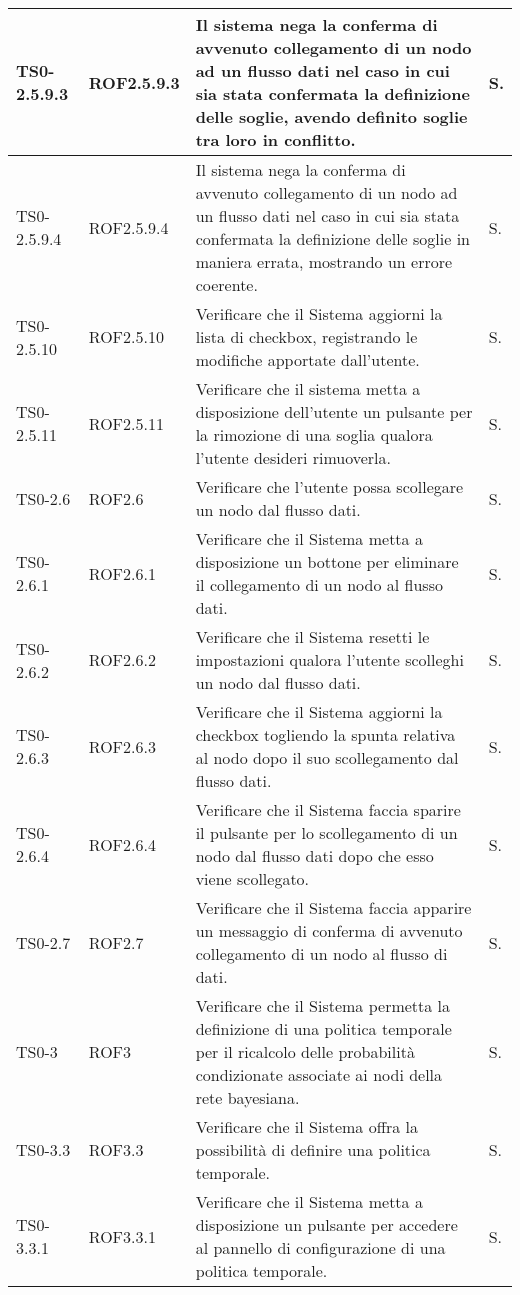 \begin{longtable}{|C{.15\textwidth}|C{.14\textwidth}|m{.51\textwidth}|C{.08\textwidth}|}
TS0-2.5.9.3 & ROF2.5.9.3  & Il sistema nega la conferma di avvenuto collegamento di un nodo ad un flusso dati nel caso in cui sia stata confermata la definizione delle soglie, avendo definito soglie tra loro in conflitto. & S. \\
\hline
TS0-2.5.9.4 & ROF2.5.9.4  & Il sistema nega la conferma di avvenuto collegamento di un nodo ad un flusso dati nel caso in cui sia stata confermata la definizione delle soglie in maniera errata, mostrando un errore coerente. & S. \\
\hline
{}TS0-2.5.10 & ROF2.5.10 & Verificare che il Sistema aggiorni la lista di checkbox, registrando le modifiche apportate dall'utente. & S. \\
\hline
TS0-2.5.11 & ROF2.5.11  & Verificare che il sistema metta a disposizione dell'utente un pulsante per la rimozione di una soglia qualora l'utente desideri rimuoverla. & S. \\
\hline
{} TS0-2.6 & ROF2.6 & Verificare che l'utente possa scollegare un nodo dal flusso dati. & S. \\
\hline
TS0-2.6.1 & ROF2.6.1 & Verificare che il Sistema metta a disposizione un bottone per eliminare il collegamento di un nodo al flusso dati. & S. \\
\hline
{}TS0-2.6.2 & ROF2.6.2 & Verificare che il Sistema resetti le impostazioni qualora l'utente scolleghi un nodo dal flusso dati. & S. \\
\hline
TS0-2.6.3 & ROF2.6.3 & Verificare che il Sistema aggiorni la checkbox togliendo la spunta relativa al nodo dopo il suo scollegamento dal flusso dati. & S. \\
\hline
{}TS0-2.6.4 & ROF2.6.4 & Verificare che il Sistema faccia sparire il pulsante per lo scollegamento di un nodo dal flusso dati dopo che esso viene scollegato. & S. \\
\hline
TS0-2.7 & ROF2.7 & Verificare che il Sistema faccia apparire un messaggio di conferma di avvenuto collegamento di un nodo al flusso di dati. & S. \\
\hline
{}TS0-3 & ROF3 & Verificare che il Sistema permetta la definizione di una politica temporale per il ricalcolo delle probabilità condizionate associate ai nodi della rete bayesiana. & S. \\
\hline
TS0-3.3 & ROF3.3 & Verificare che il Sistema offra la possibilità di definire una politica temporale. & S. \\
\hline
{}TS0-3.3.1 & ROF3.3.1 & Verificare che il Sistema metta a disposizione un pulsante per accedere al pannello di configurazione di una politica temporale. & S. \\

\end{longtable}
